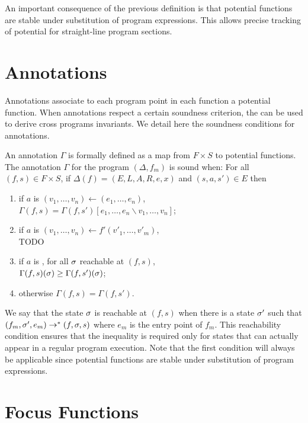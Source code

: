 \documentclass[nocopyrightspace,preprint]{sigplanconf-pldi15}
\begin{document}
An important consequence of the previous definition is that
potential functions are stable under substitution of program
expressions.  This allows precise tracking of potential for
straight-line program sections.

\section{Annotations}

Annotations associate to each program point in each function a
potential function. When annotations respect a certain soundness
criterion, the can be used to derive cross programs invariants.
We detail here the soundness conditions for annotations.

An annotation $\Gamma$ is formally defined as a map from $F \times S$ to
potential functions.  The annotation $\Gamma$ for the program $(\Delta, f_m)$
is sound when:
For all $(f, s) \in F \times S$, if $\Delta(f) = (E, L, A, R, e, x)$ and
$(s, a, s') \in E$ then

\begin{enumerate}
\item
if $a$ is $(v_1, \dots, v_n) \gets (e_1, \dots, e_n)$, \\
$\Gamma(f, s) = \Gamma(f, s')[e_1, \dots, e_n \backslash v_1, \dots, v_n]$;
\item
if $a$ is $(v_1, \dots, v_n) \gets f'(v'_1, \dots, v'_m)$, \\
TODO
\item
if $a$ is , for all $\sigma$ reachable at $(f, s)$, \\
$\Gamma(f, s)(\sigma) \ge \Gamma(f, s')(\sigma)$;
\item
otherwise $\Gamma(f, s) = \Gamma(f, s')$.
\end{enumerate}

We say that the state $\sigma$ is reachable at $(f, s)$
when there is a state $\sigma'$ such that $(f_m, \sigma', e_m)
\to^* (f, \sigma, s)$ where $e_m$ is the entry point of $f_m$.
This reachability condition ensures that
the inequality is required only for states that can actually appear
in a regular program execution.
Note that the first condition will always be applicable since potential
functions are stable under substitution of program expressions.

\section{Focus Functions}
\end{document}

